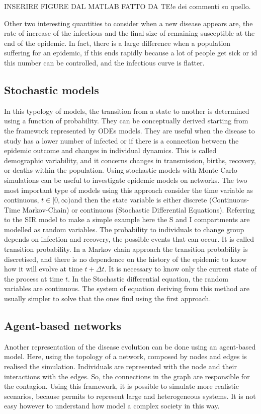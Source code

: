  
INSERIRE FIGURE DAL MATLAB FATTO DA TE!e dei commenti su quello. 

Other two interesting quantities to consider when a new disease appears are, the rate of increase of the infectious and the final size of remaining susceptible at the end of the epidemic. In fact, there is a large difference when a population suffering for an epidemic, if this ends rapidly because a lot of people get sick or id this number can be controlled, and the infectious curve is flatter.

\subsection{Stochastic models}
In this typology of models, the transition from a state to another is determined using a function of probability. They can be conceptually derived starting from the framework represented by ODEs models. They are useful when the disease to study has a lower number of infected or if there is a connection between the epidemic outcome and changes in individual dynamics. This is called demographic variability, and it concerns changes in transmission, births, recovery, or deaths within the population. Using stochastic models with Monte Carlo simulations can be useful to investigate epidemic models on networks. 
The two most important type of models using this approach consider the time variable as continuous, $t \in [0, \infty) $and then the state variable is either discrete (Continuous-Time Markov-Chain) or continuous (Stochastic Differential Equations).
Referring to the SIR model to make a simple example here the S and I compartments are modelled as random variables. The probability to individuals to change group depends on infection and recovery, the possible events that can occur. It is called transition probability. 
In a Markov chain approach the transition probability is discretised, and there is no dependence on the history of the epidemic to know how it will evolve at time $t + \Delta t$. It is necessary to know only the current state of the process at time $t$. 
In the Stochastic differential equation, the random variables are continuous. The system of equation deriving from this method are usually simpler to solve that the ones find using the first approach\cite{Allen2017}.  

\subsection{Agent-based networks}
Another representation of the disease evolution can be done using an agent-based model. Here, using the topology of a network, composed by nodes and edges is realised the simulation. Individuals are represented with the node and their interactions with the edges. So, the connections in the graph are responsible for the contagion. Using this framework, it is possible to simulate more realistic scenarios, because permits to represent large and heterogeneous systems. It is not easy however to understand how model a complex society in this way.  

